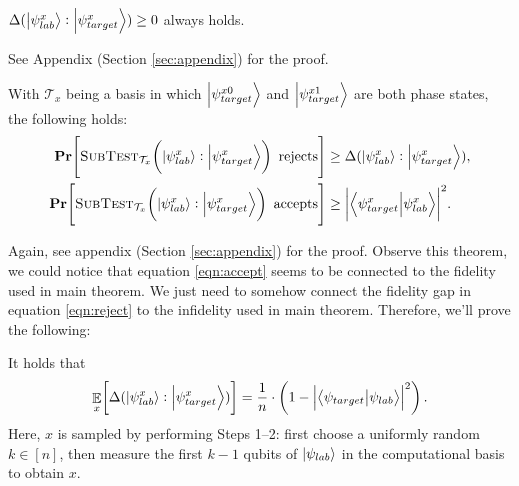 \begin{lemma}\label{rem:nonneg}
    $\Delta(\ket{\psi_{lab}^x}:\ket{\psi_{target}^x}) \geq 0$ always holds. 
\end{lemma}

See Appendix (Section \ref{sec:appendix}) for the proof.

\begin{theorem}\label{thm:subtest}
    With $\mathcal{T}_x$ being a basis in which $\ket{\psi_{target}^{x0}}$ and $\ket{\psi_{target}^{x1}}$ are both phase states, the following holds:
    \begin{align}
        \operatorname{{\bf Pr}}\!\left[\textsc{SubTest}_{\mathcal{T}_x}\!\left(\ket{\psi_{lab}^x}:\ket{\psi_{target}^x}\right) \text{ rejects}\right]
            &\geq \Delta(\ket{\psi_{lab}^x}:\ket{\psi_{target}^x}), \label{eqn:reject}\\
        \operatorname{{\bf Pr}}\!\left[\textsc{SubTest}_{\mathcal{T}_x}\!\left(\ket{\psi_{lab}^x}:\ket{\psi_{target}^x}\right) \text{ accepts}\right]
            &\geq {\left| \braket{\psi_{target}^x}{\psi_{lab}^x} \right|}^2. \label{eqn:accept}
    \end{align}
\end{theorem}

Again, see appendix (Section \ref{sec:appendix}) for the proof. Observe this theorem, 
we could notice that equation \ref{eqn:accept} seems to be connected to the fidelity used in main theorem. 
We just need to somehow connect the fidelity gap in equation \ref{eqn:reject} to the infidelity used in main theorem. 
Therefore, we'll prove the following:  

\begin{proposition}\label{prop:expectation}
    It holds that
    \[
        \mathop{\mathbb{E}}_{x}\!\left[\Delta(\ket{\psi_{lab}^x}:\ket{\psi_{target}^x})\right] = \frac{1}{n}\cdot\left(1 - {\left| \braket{\psi_{target}}{\psi_{lab}} \right|}^2\right).
    \]
    Here, $x$ is sampled by performing Steps 1--2: first choose a uniformly random $k\in[n]$, then measure the first $k-1$ qubits of $\ket{\psi_{lab}}$ in the computational basis to obtain $x$.
\end{proposition}

